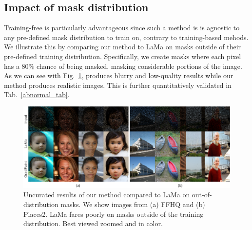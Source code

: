 \subsection{Impact of mask distribution} \label{ood_mask}

Training-free is particularly advantageous since such a method is is agnostic to any pre-defined mask distribution to train on, contrary to training-based mehods. We illustrate this by comparing our method to LaMa \cite{lama} on masks outside of their pre-defined training distribution. Specifically, we create masks where each pixel has a 80\% chance of being masked, masking considerable portions of the image. As we can see with Fig.~\ref{fig:ood}, \cite{lama} produces blurry and low-quality results while our method produces realistic images. This is further quantitatively validated in Tab.~\ref{abnormal_tab}. 

\begin{figure}[htbp]
  \centering
    \includegraphics[width=\linewidth]{images/gradpaint/abnormal_masks.pdf}
    \caption{Uncurated results of our method compared to LaMa on out-of-distribution masks. We show images from (a) FFHQ and (b) Places2. LaMa fares poorly on masks outside of the training distribution. Best viewed zoomed and in color.}
    \label{fig:ood}
\end{figure}





